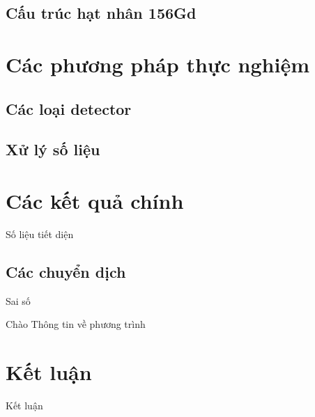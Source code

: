 \documentclass[10pt, t]{beamer}
\begin{document}
\subsection{Cấu trúc hạt nhân 156Gd}


\section{Các phương pháp thực nghiệm}
\subsection{Các loại detector}



\subsection{Xử lý số liệu}

\section{Các kết quả chính}
\begin{frame}{Số liệu tiết diện}
\end{frame}

\subsection{Các chuyển dịch}
\begin{frame}{Sai số}
\begin{block}{Chào}
Thông tin về phương trình
\end{block}
\end{frame}

\section{Kết luận}
\begin{frame}{Kết luận}
\end{frame}
\end{document}
